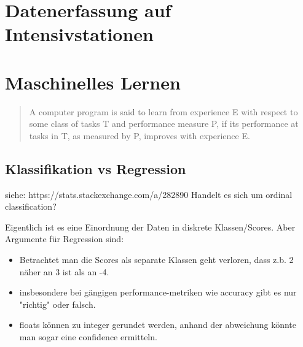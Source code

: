\section{Datenerfassung auf Intensivstationen}

\lipsum[1-3]
\section{Maschinelles Lernen}
\lipsum[4]
\begin{quote}
    {\foreignlanguage{english}{A computer program is said to learn from experience E with respect to some class of tasks T and performance measure P, if its performance at tasks in T, as measured by P, improves with experience E.}}
\end{quote}
\lipsum[5]
\subsection{Klassifikation vs Regression}
siehe: https://stats.stackexchange.com/a/282890 Handelt es sich um \glqq ordinal classification\grqq{}?

Eigentlich ist es eine Einordnung der Daten in diskrete Klassen/Scores. Aber Argumente für Regression sind:
\begin{itemize}
    \item Betrachtet man die Scores als separate Klassen geht verloren, dass z.b. 2 näher an 3 ist als an -4.
    \item insbesondere bei gängigen performance-metriken wie accuracy gibt es nur "richtig" oder falsch.
    \item floats können zu integer gerundet werden, anhand der abweichung könnte man sogar eine \glqq confidence\grqq{} ermitteln.
\end{itemize}